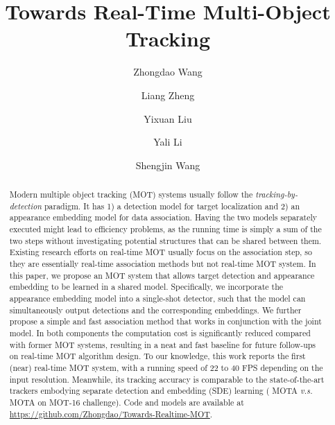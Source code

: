 \documentclass[runningheads]{llncs}
\def\vs{\textit{v.s. }}
\begin{document}
\pagestyle{headings}
\mainmatter
\def\ECCVSubNumber{100}  

\title{Towards Real-Time Multi-Object Tracking} 



\author{Zhongdao Wang \and
Liang Zheng \and
Yixuan Liu \and
Yali Li \and
Shengjin Wang }
\maketitle

\begin{abstract}
Modern multiple object tracking (MOT) systems usually follow the \emph{tracking-by-detection} paradigm. It has 1) a detection model for target localization and 2) an appearance embedding model for data association. Having the two models separately executed might lead to efficiency problems, as the running time is simply a sum of the two steps without investigating potential structures that can be shared between them. Existing research efforts on real-time MOT usually focus on the association step, so they are essentially real-time association methods but not real-time MOT system. In this paper, we propose an MOT system that allows target detection and appearance embedding to be learned in a shared model. Specifically, we incorporate the appearance embedding model into a single-shot detector, such that the model can simultaneously output detections and the corresponding embeddings.
We further propose a simple and fast association method that works in conjunction with the joint model. In both components the computation cost is significantly reduced compared with former MOT systems, resulting in a neat and fast baseline for future follow-ups on real-time MOT algorithm design.
To our knowledge, this work reports the first (near) real-time MOT system, with a running speed of 22 to 40 FPS depending on the input resolution. Meanwhile, its tracking accuracy is comparable to the state-of-the-art trackers embodying separate detection and embedding (SDE) learning ( MOTA \vs  MOTA on MOT-16 challenge). Code and models are available at \url{https://github.com/Zhongdao/Towards-Realtime-MOT}. 

\end{abstract}
\end{document}
